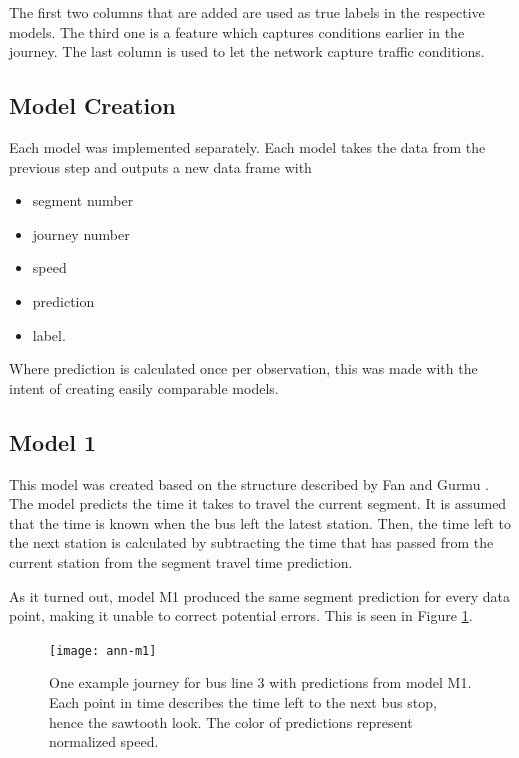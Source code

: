 \noindent The first two columns that are added are used as true labels in the respective models. The third one is a feature which captures conditions earlier in the journey. The last column is used to let the network capture traffic conditions.

\subsection{Model Creation}
Each model was implemented separately. Each model takes the data from the previous step and outputs a new data frame with 

\begin{itemize}
    \item segment number
    \item journey number
    \item speed
    \item prediction
    \item label.
\end{itemize}

Where prediction is calculated once per observation, this was made with the intent of creating easily comparable models.

\subsection{Model 1}
This model was created based on the structure described by Fan and Gurmu \cite{brazilANN}. The model predicts the time it takes to travel the current segment. It is assumed that the time is known when the bus left the latest station. Then, the time left to the next station is calculated by subtracting the time that has passed from the current station from the segment travel time prediction.

As it turned out, model M1 produced the same segment prediction for every data point, making it unable to correct potential errors. This is seen in Figure \ref{fig:ann-m1}.


\begin{figure}[h]
  \begin{minipage}{\textwidth}
    \begin{adjustbox}{center}
      \texttt{[image: ann-m1]}
    \end{adjustbox}  
      \caption{One example journey for bus line 3 with predictions from model M1. Each point in time describes the time left to the next bus stop, hence the sawtooth look. The color of predictions represent normalized speed.}
      \label{fig:ann-m1}      
    \end{minipage}
\end{figure}


